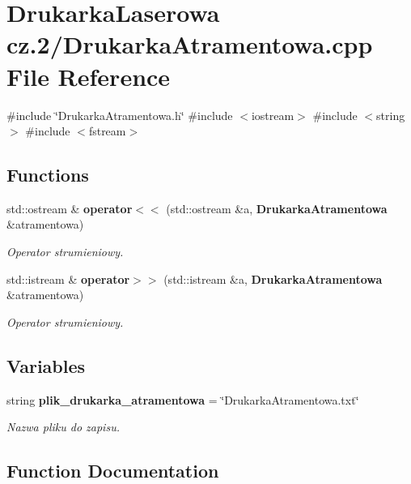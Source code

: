 \section{Drukarka\+Laserowa cz.2/\+Drukarka\+Atramentowa.cpp File Reference}
\label{_drukarka_atramentowa_8cpp}
{\ttfamily \#include \char`\"{}Drukarka\+Atramentowa.\+h\char`\"{}}\newline
{\ttfamily \#include $<$iostream$>$}\newline
{\ttfamily \#include $<$string$>$}\newline
{\ttfamily \#include $<$fstream$>$}\newline
\subsection*{Functions}
\begin{DoxyCompactItemize}
\item 
std\+::ostream \& \textbf{ operator$<$$<$} (std\+::ostream \&a, \textbf{ Drukarka\+Atramentowa} \&atramentowa)
\begin{DoxyCompactList}\small\item\em Operator strumieniowy. \end{DoxyCompactList}\item 
std\+::istream \& \textbf{ operator$>$$>$} (std\+::istream \&a, \textbf{ Drukarka\+Atramentowa} \&atramentowa)
\begin{DoxyCompactList}\small\item\em Operator strumieniowy. \end{DoxyCompactList}\end{DoxyCompactItemize}
\subsection*{Variables}
\begin{DoxyCompactItemize}
\item 
string \textbf{ plik\+\_\+drukarka\+\_\+atramentowa} = \char`\"{}Drukarka\+Atramentowa.\+txt\char`\"{}
\begin{DoxyCompactList}\small\item\em Nazwa pliku do zapisu. \end{DoxyCompactList}\end{DoxyCompactItemize}


\subsection{Function Documentation}
\mbox{\label{_drukarka_atramentowa_8cpp_ad64f242b639e39ead86b549a16794760}} 
